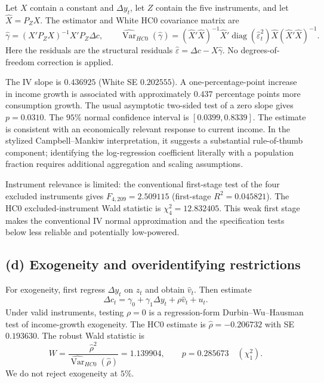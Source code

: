 Let $X$ contain a constant and $\Delta y_t$, let $Z$ contain the five
instruments, and let $\widehat X=P_ZX$.
The estimator and White HC0 covariance matrix are
\[
\widehat\gamma=(X'P_ZX)^{-1}X'P_Z\Delta c,\qquad
\widehat{\operatorname{Var}}_{HC0}(\widehat\gamma)
=(\widehat X'\widehat X)^{-1}
\widehat X'\operatorname{diag}(\widehat\varepsilon_t^2)\widehat X
(\widehat X'\widehat X)^{-1}.
\]
Here the residuals are the structural residuals
$\widehat\varepsilon=\Delta c-X\widehat\gamma$.
No degrees-of-freedom correction is applied.
\begin{table}[H]
\centering
\caption{Consumption growth on current income growth, $n=214$}
\label{tab:iv}

\end{table}
The IV slope is $0.436925$ (White SE $0.202555$).
A one-percentage-point increase in income growth is associated with
approximately $0.437$ percentage points more consumption growth.
The usual asymptotic two-sided test of a zero slope gives $p=0.0310$.
The $95\%$ normal confidence interval is $[0.0399,0.8339]$.
The estimate is consistent with an economically relevant response
to current income. In the stylized Campbell--Mankiw interpretation,
it suggests a substantial rule-of-thumb component; identifying the
log-regression coefficient literally with a population fraction requires
additional aggregation and scaling assumptions.

Instrument relevance is limited: the conventional first-stage test
of the four excluded instruments gives $F_{4,209}=2.509115$
(first-stage $R^2=0.045821$).
The HC0 excluded-instrument Wald statistic is $\chi^2_4=12.832405$.
This weak first stage makes the conventional IV normal approximation
and the specification tests below less reliable and potentially low-powered.

\clearpage
\subsection*{(d) Exogeneity and overidentifying restrictions}
For exogeneity, first regress $\Delta y_t$ on $z_t$ and obtain
$\widehat v_t$. Then estimate
\[
\Delta c_t=\gamma_0+\gamma_1\Delta y_t+\rho\widehat v_t+u_t.
\]
Under valid instruments, testing $\rho=0$ is a regression-form
Durbin--Wu--Hausman test of income-growth exogeneity.
The HC0 estimate is $\widehat\rho=-0.206732$ with SE $0.193630$.
The robust Wald statistic is
\[
W=\frac{\widehat\rho^2}{\widehat{\operatorname{Var}}_{HC0}(\widehat\rho)}
=1.139904,\qquad p=0.285673\quad(\chi^2_1).
\]
We do not reject exogeneity at $5\%$.


